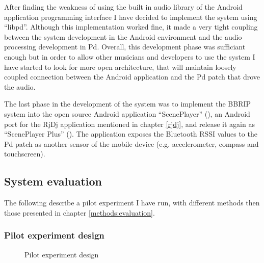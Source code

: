 \documentclass[a4paper,11pt]{article}
\begin{document}
{After finding the weakness of using the built in audio library of the Android application programming interface I have decided to implement the system using ``libpd''.
Although this implementation worked fine, it made a very tight coupling between the system development in the Android environment and the audio processing development in Pd.
Overall, this development phase was sufficiant enough but in order to allow other musicians and developers to use the system I have started to look for more open architecture, that will maintain loosely coupled connection between the Android application and the Pd patch that drove the audio.

The last phase in the development of the system was to implement the BBRIP system into the open source Android application ``ScenePlayer'' (\cite{web:sceneplayer}), an Android port for the RjDj application mentioned in chapter \ref{rjdj}, and release it again as ``ScenePlayer Plus'' (\cite{web:sceneplayerplus}).
The application exposes the Bluetooth RSSI values to the Pd patch as another sensor of the mobile device (e.g. accelerometer, compass and touchscreen).

\subsection{System evaluation}

The following describe a pilot experiment I have run, with different methods then those presented in chapter \ref{methods:evaluation}.

\subsubsection{Pilot experiment design}

\begin{figure}[!htb]
	\centering
	\def\svgwidth{0.95\columnwidth}
  	
	\caption{Pilot experiment design}\label{fig:pilot}
\end{figure}

}
\end{document}
